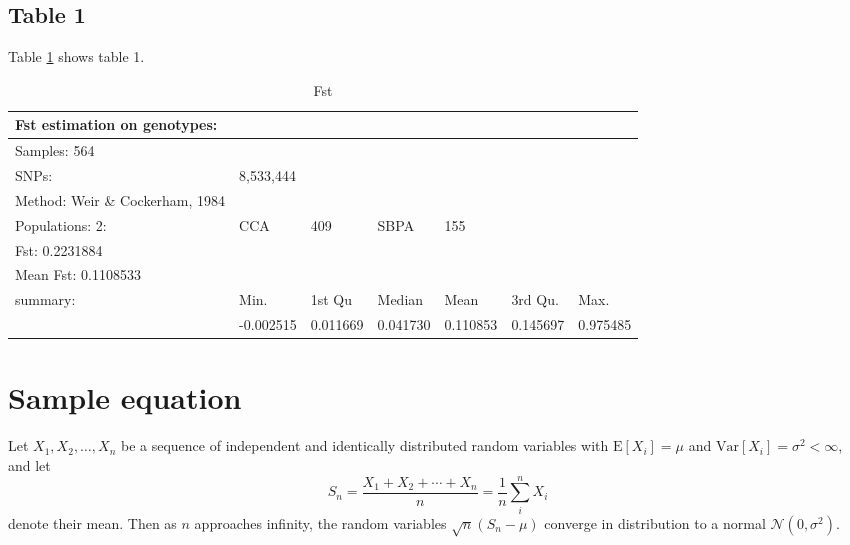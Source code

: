 \documentclass[9pt, onecolumn,twoside]{gsajnl}
\begin{document}
\subsection{Table 1}

Table  \ref{tab:fst} shows table 1. 


\begin{table}[p]
\centering 
\caption{Fst}
\begin{tableminipage}
\begin{tabular}{|l|l|l|l|l|l|l|}
\hline
Fst estimation on genotypes:    &           &          &          &          &          &          \\ \hline
Samples: 564                    &           &          &          &          &          &          \\ \hline
SNPs:                           & 8,533,444 &          &          &          &          &          \\ \hline
Method: Weir \& Cockerham, 1984 &           &          &          &          &          &          \\ \hline
Populations: 2:                 & CCA       & 409      & SBPA     & 155      &          &          \\ \hline
Fst:  0.2231884                 &           &          &          &          &          &          \\ \hline
Mean Fst: 0.1108533             &           &          &          &          &          &          \\ \hline
summary:                        & Min.      & 1st Qu   & Median   & Mean     & 3rd Qu.  & Max.     \\ \hline
                                & -0.002515 & 0.011669 & 0.041730 & 0.110853 & 0.145697 & 0.975485 \\ \hline
\end{tabular}
  \label{tab:fst}
\end{tableminipage}
\end{table}







\section{Sample equation}

Let $X_1, X_2, \ldots, X_n$ be a sequence of independent and identically distributed random variables with $\text{E}[X_i] = \mu$ and $\text{Var}[X_i] = \sigma^2 < \infty$, and let
\begin{equation}
S_n = \frac{X_1 + X_2 + \cdots + X_n}{n}
      = \frac{1}{n}\sum_{i}^{n} X_i
\label{eq:refname1}
\end{equation}
denote their mean. Then as $n$ approaches infinity, the random variables $\sqrt{n}(S_n - \mu)$ converge in distribution to a normal $\mathcal{N}(0, \sigma^2)$.
\end{document}

